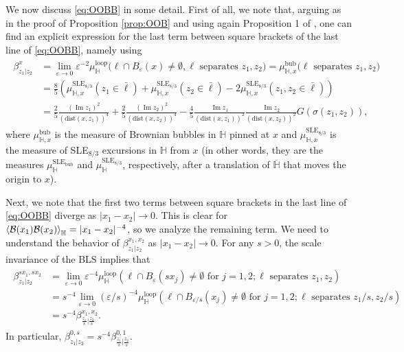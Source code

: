 \documentclass[a4paper,11pt]{article}
\renewcommand{\Im}{\operatorname{Im}}
\begin{document}
\medskip


We now discuss \eqref{eq:OOBB} in some detail. First of all, we note that, arguing as in the proof of Proposition \ref{prop:OOB} and using again Proposition 1 of \cite{beliaev2013some}, one can find an explicit expression for the last term between square brackets of the last line of \eqref{eq:OOBB}, namely using
\begin{align}
\begin{split} \label{eq:betaxzz}
    \beta^x_{z_1|z_2} &= \lim_{\varepsilon \to 0} \varepsilon^{-2} \mu^{\text{loop}}_{\mathbb{H}}\big( \ell \cap B_{\varepsilon}(x) \neq \emptyset, \ell \text{ separates } z_1,z_2 \big) = \mu^{\text{bub}}_{\mathbb{H},x}\big(\ell \text{ separates } z_1,z_2 \big) \\
    &= \frac{8}{5} \left( \mu^{\text{SLE}_{8/3}}_{\mathbb{H},x}(z_1 \in \bar\ell) + \mu^{\text{SLE}_{8/3}}_{\mathbb{H},x}(z_2 \in \bar\ell) - 2 \mu^{\text{SLE}_{8/3}}_{\mathbb{H},x}(z_1,z_2 \in \bar\ell) \right) \\
    &= \frac{2}{5} \frac{(\Im z_1)^2}{\left(\text{dist}(x,z_1)\right)^4} + \frac{2}{5} \frac{(\Im z_2)^2}{\left(\text{dist}(x,z_2)\right)^4} - \frac{4}{5} \frac{\Im z_1}{\left(\text{dist}(x,z_1)\right)^2} \frac{\Im z_2}{\left(\text{dist}(x,z_2)\right)^2} G(\sigma(z_1,z_2)),
\end{split}
\end{align}
where $\mu^{\text{bub}}_{\mathbb{H},x}$ is the measure of Brownian bubbles in $\mathbb{H}$ pinned at $x$ and $\mu^{\text{SLE}_{8/3}}_{\mathbb{H},x}$ is the measure of SLE$_{8/3}$ excursions in $\mathbb{H}$ from $x$ (in other words, they are the measures $\mu^{\text{SLE}_{\text{bub}}}_{\mathbb{H}}$ and $\mu^{\text{SLE}_{8/3}}_{\mathbb{H}}$, respectively, after a translation of $\overline{\mathbb{H}}$ that moves the origin to $x$).

Next, we note that the first two terms between square brackets in the last line of \eqref{eq:OOBB} diverge as $|x_1-x_2| \to 0$. This is clear for $\Braket{{\mathcal B}(x_1){\mathcal B}(x_2)}_{\mathbb H} = |x_1-x_2|^{-4}$, so we analyze the remaining term. We need to understand the behavior of $\beta^{x_1,x_2}_{z_1|z_2}$ as $|x_1-x_2| \to 0$. For any $s>0$, the scale invariance of the BLS implies that
\begin{align}
\begin{split}
    \beta^{sx_1,sx_2}_{z_1|z_2} &= \lim_{\varepsilon \to 0} \varepsilon^{-4} \mu_{\mathbb{H}}^{\text{loop}}(\ell \cap B_{\varepsilon}(s x_j) \neq \emptyset \text{ for } j=1,2; \ell \text{ separates } z_1,z_2) \\
    &= s^{-4} \lim_{\varepsilon \to 0} (\varepsilon/s)^{-4} \mu_{\mathbb{H}}^{\text{loop}}(\ell \cap B_{\varepsilon/s}(x_j) \neq \emptyset \text{ for } j=1,2; \ell \text{ separates } z_1/s,z_2/s) \\
    &= s^{-4} \beta^{x_1,x_2}_{\frac{z_1}{s}|\frac{z_2}{s}}.
\end{split}
\end{align}
In particular, $\beta^{0,s}_{z_1|z_2} = s^{-4} \beta^{0,1}_{\frac{z_1}{s}|\frac{z_2}{s}}$.
\end{document}
